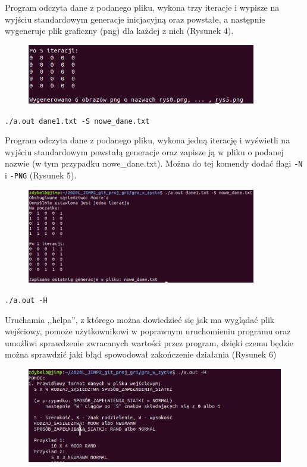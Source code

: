\documentclass{article}
\begin{document}
{\newpage


Program odczyta dane z podanego pliku, wykona trzy iteracje i wypisze na wyjściu standardowym generacje inicjacyjną oraz powstałe, a następnie wygeneruje plik graficzny (png) dla każdej z nich (Rysunek 4).

\begin{figure}[h]
\centering
\includegraphics[width=10cm]{PNG.png}
\caption{}
\label{fig:PNG.png}
\end{figure}

\newline
\newline

\texttt{./a.out dane1.txt -S nowe\_dane.txt } 

Program odczyta dane z podanego pliku, wykona jedną iterację i wyświetli na wyjściu standardowym powstałą generacje oraz zapisze ją w pliku o podanej nazwie (w tym przypadku  nowe\_dane.txt). Można do tej komendy dodać flagi \texttt{-N} i \texttt{-PNG} (Rysunek 5).

\begin{figure}[h]
\centering
\includegraphics[width=10cm]{flagaS.png}
\caption{}
\label{fig:flagaS.png}
\end{figure}
\newline
\newline

\texttt{./a.out -H }

Uruchamia ,,helpa'', z którego można dowiedzieć się jak ma wyglądać plik wejściowy, pomoże użytkownikowi w poprawnym uruchomieniu programu oraz umożliwi sprawdzenie zwracanych wartości przez program, dzięki czemu będzie można sprawdzić jaki błąd spowodował zakończenie działania (Rysunek 6)
\newline
\begin{figure}[h]
\centering
\includegraphics[width=12cm]{help.png}
\caption{}
\label{fig:help.png}
\end{figure}




}
\end{document}
